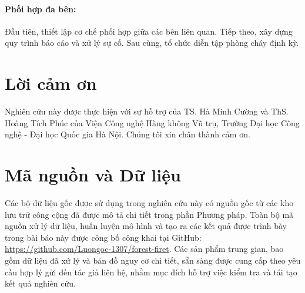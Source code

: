 \documentclass{article}
\begin{document}
\paragraph{Phối hợp đa bên:}
Đầu tiên, thiết lập cơ chế phối hợp giữa các bên liên quan. Tiếp theo, xây dựng quy trình báo cáo và xử lý sự cố. Sau cùng, tổ chức diễn tập phòng cháy định kỳ.
\section*{Lời cảm ơn} %
Nghiên cứu này được thực hiện với sự hỗ trợ của TS. Hà Minh Cường và ThS. Hoàng Tích Phúc của Viện Công nghệ Hàng không Vũ trụ, Trường Đại học Công nghệ - Đại học Quốc gia Hà Nội. Chúng tôi xin chân thành cảm ơn.

\section*{Mã nguồn và Dữ liệu} %
Các bộ dữ liệu gốc được sử dụng trong nghiên cứu này có nguồn gốc từ các kho lưu trữ công cộng đã được mô tả chi tiết trong phần Phương pháp. Toàn bộ mã nguồn xử lý dữ liệu, huấn luyện mô hình và tạo ra các kết quả được trình bày trong bài báo này được công bố công khai tại GitHub: {\color{blue}\url{https://github.com/Luongoc-1307/forest-firet}}. Các sản phẩm trung gian, bao gồm dữ liệu đã xử lý và bản đồ nguy cơ chi tiết, sẵn sàng được cung cấp theo yêu cầu hợp lý gửi đến tác giả liên hệ, nhằm mục đích hỗ trợ việc kiểm tra và tái tạo kết quả nghiên cứu.


\printbibliography %
\end{document}
